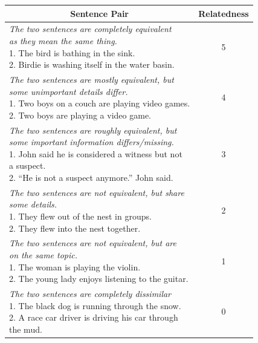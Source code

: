 \begin{enumerate}
 
   \begin{table}[ht!]
 	\centering 	
 	\begin{tabular}{l|c} 
 		\hline
 		\multicolumn{1}{c|}{\textbf{Sentence Pair}} & 
 		\multicolumn{1}{c}{\textbf{Relatedness}}  \\
 		\hline
 		\makecell[l]
 		{\textit{The two sentences are completely equivalent}  \\ \textit{as they mean the same thing.} \\
 			1. The bird is bathing in the sink. \\ 
 			2. Birdie is washing itself in the water basin.} & 5  \\
 		\hline
 		\makecell[l]
 		{\textit{The two sentences are mostly equivalent, but}  \\ \textit{some unimportant details differ.} \\
 			1. Two boys on a couch are playing video games. \\ 
 			2. Two boys are playing a video game.} & 4  \\
 		\hline
 		\makecell[l]
 		{\textit{The two sentences are roughly equivalent, but }  \\ \textit{some important information differs/missing.} \\
 			1. John said he is considered a witness but not \\ a suspect. \\ 
 			2. “He is not a suspect anymore.” John said.} & 3  \\
 		\hline
 		\makecell[l]
 		{\textit{The two sentences are not equivalent, but share } \\
 			\textit{some details.} \\
 			1. They flew out of the nest in groups. \\ 
 			2. They flew into the nest together.} & 2  \\
 		\hline
 		\makecell[l]
 		{\textit{The two sentences are not equivalent, but are } \\
 			\textit{on the same topic.} \\
 			1. The woman is playing the violin. \\ 
 			2. The young lady enjoys listening to the guitar.} & 1  \\
 		\hline
 		\makecell[l]
 		{\textit{The two sentences are completely dissimilar} \\
 			1. The black dog is running through the snow. \\ 
 			2. A race car driver is driving his car through \\ the mud.} & 0  \\
 		\hline
 	

\end{tabular}
\end{table}
\end{enumerate}
